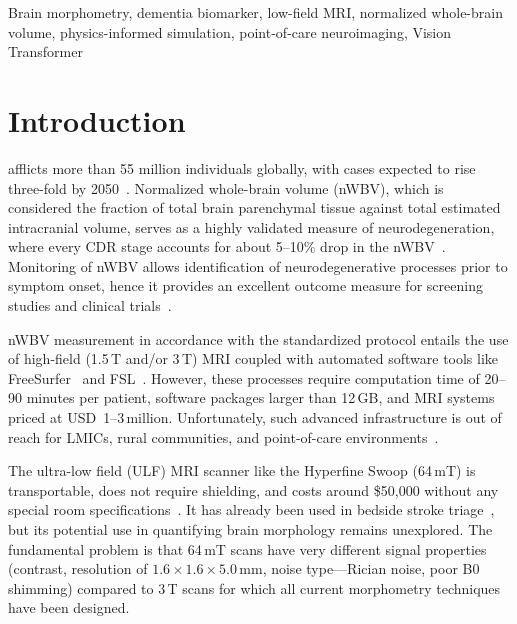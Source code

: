 \documentclass{ieeeaccess}
\begin{document}
\begin{keywords}
Brain morphometry, dementia biomarker, low-field MRI, normalized whole-brain
volume, physics-informed simulation, point-of-care neuroimaging,
Vision Transformer
\end{keywords}

\titlepgskip=-15pt
\maketitle

\section{Introduction}
\label{sec:introduction}

 afflicts more than 55 million individuals globally,
with cases expected to rise three-fold by 2050~\cite{who2023}. Normalized
whole-brain volume (nWBV), which is considered the fraction of total brain
parenchymal tissue against total estimated intracranial volume, serves as a
highly validated measure of neurodegeneration, where every CDR stage accounts
for about 5--10\% drop in the nWBV~\cite{fotenos2005,buckner2004}. Monitoring
of nWBV allows identification of neurodegenerative processes prior to symptom
onset, hence it provides an excellent outcome measure for screening studies
and clinical trials~\cite{jack2018nia}.

nWBV measurement in accordance with the standardized protocol entails the use
of high-field (1.5\,T and/or 3\,T) MRI coupled with automated software tools
like FreeSurfer~\cite{fischl2012freesurfer} and FSL~\cite{smith2002fsl}.
However, these processes require computation time of 20--90 minutes per
patient, software packages larger than 12\,GB, and MRI systems priced at
USD~1--3\,million. Unfortunately, such advanced infrastructure is out of reach
for LMICs, rural communities, and point-of-care environments~\cite{prince2016world}.

The ultra-low field (ULF) MRI scanner like the Hyperfine Swoop (64\,mT) is
transportable, does not require shielding, and costs around \$50,000 without
any special room specifications~\cite{hyperfine2021}. It has already been used
in bedside stroke triage~\cite{kimberly2023bedside}, but its potential use in
quantifying brain morphology remains unexplored. The fundamental problem is
that 64\,mT scans have very different signal properties (contrast, resolution
of $1.6\times1.6\times5.0$\,mm, noise type---Rician noise, poor B0 shimming)
compared to 3\,T scans for which all current morphometry techniques have been
designed.
\end{document}
